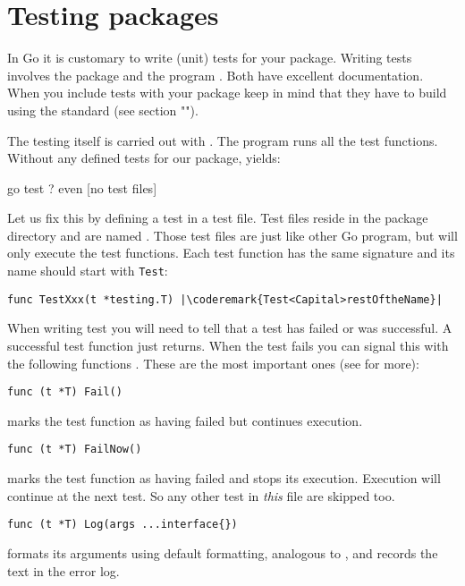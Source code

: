 \section{Testing packages}
In Go it is customary to write (unit) tests for your package. Writing
tests involves the  package and the program
. Both
have excellent documentation. When you include tests with your package
keep in mind that they have to build using the standard 
(see section "").


The testing itself is carried out with .
The  program runs all the test functions. Without any
defined tests for our  package,  yields:
\begin{display}
\pr go test
?       even    [no test files]
\end{display}
Let us fix this by defining a test in a test file. Test files reside
in the package directory and are named . Those test
files are just like other Go program, but  will only
execute the test functions.
Each test function has the same signature and its name should start
with \lstinline{Test}:
\begin{lstlisting}
func TestXxx(t *testing.T) |\coderemark{Test<Capital>restOftheName}|
\end{lstlisting}

When writing test you will need to tell  that a test has
failed or was successful. A successful test function just returns. When
the test fails you can signal this with the following
functions \cite{go_doc}. These are the most important ones (see 
for more):

\begin{lstlisting}[numbers=none]
func (t *T) Fail()
\end{lstlisting}
 marks the test function as having failed but continues execution.

\begin{lstlisting}[numbers=none]
func (t *T) FailNow()
\end{lstlisting}
 marks the test function as having failed and stops its execution.
Execution will continue at the next test. So any other test in
\emph{this} file are skipped too.

\begin{lstlisting}[numbers=none]
func (t *T) Log(args ...interface{})
\end{lstlisting}
 formats its arguments using default formatting, analogous to
, and records the text in the error log.

